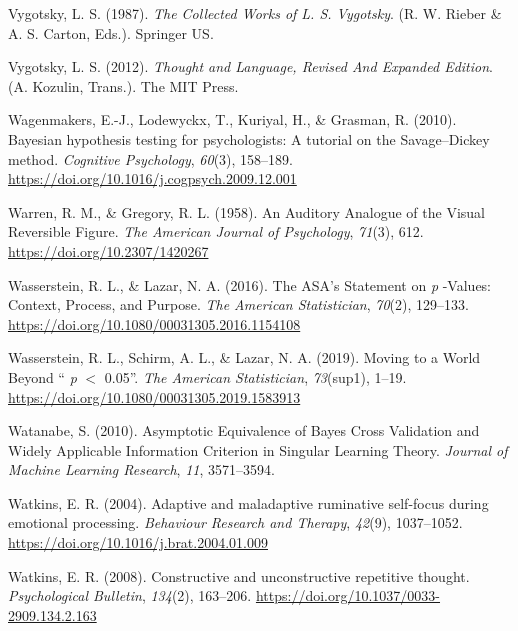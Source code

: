 \documentclass[a4paper,12pt,twoside,onecolumn,openright,final,oldfontcommands]{memoir}
\begin{document}
\leavevmode\hypertarget{ref-vygotsky_collected_1987}{}%
Vygotsky, L. S. (1987). \emph{The Collected Works of L. S. Vygotsky}. (R. W. Rieber \& A. S. Carton, Eds.). Springer US.

\leavevmode\hypertarget{ref-vygotsky_thought_2012}{}%
Vygotsky, L. S. (2012). \emph{Thought and Language, Revised And Expanded Edition}. (A. Kozulin, Trans.). The MIT Press.

\leavevmode\hypertarget{ref-wagenmakers_bayesian_2010}{}%
Wagenmakers, E.-J., Lodewyckx, T., Kuriyal, H., \& Grasman, R. (2010). Bayesian hypothesis testing for psychologists: A tutorial on the Savage--Dickey method. \emph{Cognitive Psychology}, \emph{60}(3), 158--189. \url{https://doi.org/10.1016/j.cogpsych.2009.12.001}

\leavevmode\hypertarget{ref-warren_auditory_1958}{}%
Warren, R. M., \& Gregory, R. L. (1958). An Auditory Analogue of the Visual Reversible Figure. \emph{The American Journal of Psychology}, \emph{71}(3), 612. \url{https://doi.org/10.2307/1420267}

\leavevmode\hypertarget{ref-wasserstein_asas_2016}{}%
Wasserstein, R. L., \& Lazar, N. A. (2016). The ASA's Statement on \emph{p} -Values: Context, Process, and Purpose. \emph{The American Statistician}, \emph{70}(2), 129--133. \url{https://doi.org/10.1080/00031305.2016.1154108}

\leavevmode\hypertarget{ref-wasserstein_moving_2019}{}%
Wasserstein, R. L., Schirm, A. L., \& Lazar, N. A. (2019). Moving to a World Beyond `` \emph{p} \(<\) 0.05''. \emph{The American Statistician}, \emph{73}(sup1), 1--19. \url{https://doi.org/10.1080/00031305.2019.1583913}

\leavevmode\hypertarget{ref-watanabe_asymptotic_2010}{}%
Watanabe, S. (2010). Asymptotic Equivalence of Bayes Cross Validation and Widely Applicable Information Criterion in Singular Learning Theory. \emph{Journal of Machine Learning Research}, \emph{11}, 3571--3594.

\leavevmode\hypertarget{ref-watkins_adaptive_2004}{}%
Watkins, E. R. (2004). Adaptive and maladaptive ruminative self-focus during emotional processing. \emph{Behaviour Research and Therapy}, \emph{42}(9), 1037--1052. \url{https://doi.org/10.1016/j.brat.2004.01.009}

\leavevmode\hypertarget{ref-Watkins2008}{}%
Watkins, E. R. (2008). Constructive and unconstructive repetitive thought. \emph{Psychological Bulletin}, \emph{134}(2), 163--206. \url{https://doi.org/10.1037/0033-2909.134.2.163}
\end{document}
